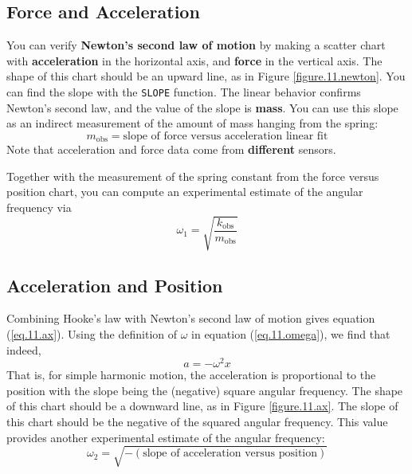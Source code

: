 \subsection{Force and Acceleration}
You can verify \textbf{Newton's second law of motion} by making a scatter chart with \textbf{acceleration} in the horizontal axis, and \textbf{force} in the vertical axis. The shape of this chart should be an upward line, as in Figure \ref{figure.11.newton}. You can find the slope with the \texttt{SLOPE} function. The linear behavior confirms Newton's second law, and the value of the slope is \textbf{mass}. You can use this slope as an indirect measurement of the amount of mass hanging from the spring:
\begin{equation}
    m_{\text{obs}} = \text{slope of force versus acceleration linear fit}
\end{equation}
Note that acceleration and force data come from \textbf{different} sensors.

Together with the measurement of the spring constant from the force versus position chart, you can compute an experimental estimate of the angular frequency via
\begin{equation}
    \omega_{1} = \sqrt{\frac{k_{\text{obs}}}{m_{\text{obs}}}}
\end{equation}
\subsection{Acceleration and Position}
Combining Hooke's law with Newton's second law of motion gives equation (\ref{eq.11.ax}). Using the definition of $\omega$ in equation (\ref{eq.11.omega}), we find that indeed,
\begin{equation}
    a = -\omega^{2}x
\end{equation}
That is, for simple harmonic motion, the acceleration is proportional to the position with the slope being the (negative) square angular frequency. The shape of this chart should be a downward line, as in Figure \ref{figure.11.ax}. The slope of this chart should be the negative of the squared angular frequency. This value provides another experimental estimate of the angular frequency:
\begin{equation}
    \omega_{2} = \sqrt{- (\text{slope of acceleration versus position})}
\end{equation}
